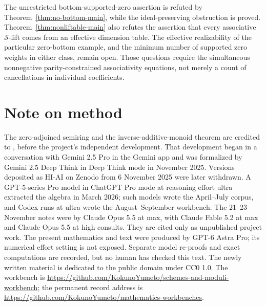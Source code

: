 \documentclass[11pt]{article}
\newcommand{\workbenchurl}{https://github.com/KokunoYumeto/schemes-and-moduli-workbench}
\newcommand{\recordurl}{https://github.com/KokunoYumeto/mathematics-workbenches}
\theoremstyle{definition}\newtheorem{definition}[theorem]{Definition}
\begin{document}


The unrestricted bottom-supported-zero assertion is refuted by Theorem~\ref{thm:no-bottom-main}, while the ideal-preserving obstruction is proved. Theorem~\ref{thm:nonliftable-main} also refutes the assertion that every associative $\mathcal S$-lift comes from an effective dimension table. The effective realizability of the particular zero-bottom example, and the minimum number of supported zero weights in either class, remain open. Those questions require the simultaneous nonnegative parity-constrained associativity equations, not merely a count of cancellations in individual coefficients.

\section*{Note on method}
The zero-adjoined semiring and the inverse-additive-monoid theorem are credited to \citet[Definition 3.6 and Proposition 6.1]{FGJM}, before the project's independent development. That development began in a conversation with Gemini 2.5 Pro in the Gemini app and was formalized by Gemini 2.5 Deep Think in Deep Think mode in November 2025. Versions deposited as HI-AI on Zenodo from 6 November 2025 were later withdrawn. A GPT-5-series Pro model in ChatGPT Pro mode at reasoning effort ultra extracted the algebra in March 2026; such models wrote the April--July corpus, and Codex runs at ultra wrote the August--September workbench. The 21--23 November notes were by Claude Opus 5.5 at max, with Claude Fable 5.2 at max and Claude Opus 5.5 at high consults. They are cited only as unpublished project work. The present mathematics and text were produced by GPT-6 Astra Pro; its numerical effort setting is not exposed. Separate model re-proofs and exact computations are recorded, but no human has checked this text. The newly written material is dedicated to the public domain under CC0 1.0. The workbench is \url{\workbenchurl}; the permanent record address is \url{\recordurl}.
\end{document}
